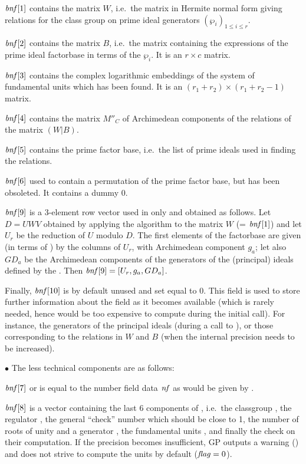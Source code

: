 $\hbox{\it bnf\/}[1]$ contains the matrix $W$, i.e.~the matrix in Hermite normal
form giving relations for the class group on prime ideal generators
$(\wp_i)_{1\le i\le r}$.

$\hbox{\it bnf\/}[2]$ contains the matrix $B$, i.e.~the matrix containing the
expressions of the prime ideal factorbase in terms of the $\wp_i$. It is an
$r\times c$ matrix.

$\hbox{\it bnf\/}[3]$ contains the complex logarithmic embeddings of the system of
fundamental units which has been found. It is an $(r_1+r_2)\times(r_1+r_2-1)$
matrix.

$\hbox{\it bnf\/}[4]$ contains the matrix $M''_C$ of Archimedean components of the
relations of the matrix $(W|B)$.

$\hbox{\it bnf\/}[5]$ contains the prime factor base, i.e.~the list of prime
ideals used in finding the relations.

$\hbox{\it bnf\/}[6]$ used to contain a permutation of the prime factor base, but
has been obsoleted. It contains a dummy $0$.

$\hbox{\it bnf\/}[9]$ is a 3-element row vector used in  only
and obtained as follows.  Let $D = U W V$ obtained by applying the
 algorithm to the matrix $W$ (= $\hbox{\it bnf\/}[1]$) and
let $U_r$ be the reduction of $U$ modulo $D$. The first elements of the
factorbase are given (in terms of ) by the columns of $U_r$,
with Archimedean component $g_a$; let also $GD_a$ be the Archimedean
components of the generators of the (principal) ideals defined by the
. Then $\hbox{\it bnf\/}[9]=[U_r, g_a, GD_a]$.

Finally, $\hbox{\it bnf\/}[10]$ is by default unused and set equal to 0. This
field is used to store further information about the field as it becomes
available (which is rarely needed, hence would be too expensive to compute
during the initial  call). For instance, the generators of the
principal ideals  (during a call to
), or those corresponding to the relations in $W$ and
$B$ (when the  internal precision needs to be increased).
\smallskip

\noindent$\bullet$ The less technical components are as follows:

$\hbox{\it bnf\/}[7]$ or  is equal to the number field data
$\hbox{\it nf\/}$ as would be given by .

$\hbox{\it bnf\/}[8]$ is a vector containing the last 6 components of
, i.e.~the classgroup , the
regulator , the general ``check'' number which should be
close to 1, the number of roots of unity and a generator ,
the fundamental units , and finally the check on their
computation. If the precision becomes insufficient, GP outputs a warning
() and does not strive to
compute the units by default ($\hbox{\it f\kern0pt lag\/}=0$).

